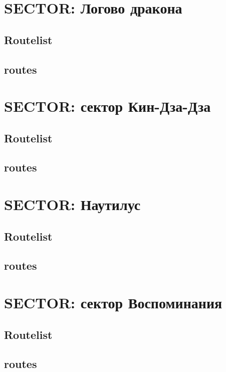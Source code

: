 \documentclass[8pt, a4paper,notitlepage,openany]{report}
\begin{document}
\chapter{SECTOR: Логово дракона}
\section*{Routelist}

\newpage
\section*{routes}





\chapter{SECTOR: сектор Кин-Дза-Дза}
\section*{Routelist}

\newpage
\section*{routes}




\chapter{SECTOR: Наутилус}
\section*{Routelist}

\newpage
\section*{routes}




\chapter{SECTOR: сектор Воспоминания}
\section*{Routelist}

\newpage
\section*{routes}














 
\end{document}
